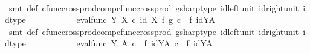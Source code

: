 \begin{isabellebody}
\ \ \ \ \ \ \ \ \isamarkupfalse%
\ {\isacharparenleft}{\kern0pt}smt\ {\isasympsi}{\isacharunderscore}{\kern0pt}def\ cfunc{\isacharunderscore}{\kern0pt}cross{\isacharunderscore}{\kern0pt}prod{\isacharunderscore}{\kern0pt}comp{\isacharunderscore}{\kern0pt}cfunc{\isacharunderscore}{\kern0pt}cross{\isacharunderscore}{\kern0pt}prod\ gsharp{\isacharunderscore}{\kern0pt}type\ id{\isacharunderscore}{\kern0pt}left{\isacharunderscore}{\kern0pt}unit{}\ id{\isacharunderscore}{\kern0pt}right{\isacharunderscore}{\kern0pt}unit{}\ id{\isacharunderscore}{\kern0pt}type{\isacharparenright}{\kern0pt}\isanewline
\ \ \ \ \ \ \isamarkupfalse%
\ \isamarkupfalse%
\ {\isachardoublequoteopen}{\isachardot}{\kern0pt}{\isachardot}{\kern0pt}{\isachardot}{\kern0pt}\ {\isacharequal}{\kern0pt}\ eval{\isacharunderscore}{\kern0pt}func\ Y\ X\ {\isasymcirc}\isactrlsub c\ {\isacharparenleft}{\kern0pt}id\ X\ {\isasymtimes}\isactrlsub f\ g\isactrlsup {\isasymsharp}{\isacharparenright}{\kern0pt}\ {\isasymcirc}\isactrlsub c\ {\isacharparenleft}{\kern0pt}{\isasympsi}\ {\isasymtimes}\isactrlsub f\ id{\isacharparenleft}{\kern0pt}Y\isactrlbsup A\isactrlesup {\isacharparenright}{\kern0pt}{\isacharparenright}{\kern0pt}{\isachardoublequoteclose}\isanewline
\ \ \ \ \ \ \ \ \isamarkupfalse%
\ {\isacharparenleft}{\kern0pt}smt\ {\isasympsi}{\isacharunderscore}{\kern0pt}def\ cfunc{\isacharunderscore}{\kern0pt}cross{\isacharunderscore}{\kern0pt}prod{\isacharunderscore}{\kern0pt}comp{\isacharunderscore}{\kern0pt}cfunc{\isacharunderscore}{\kern0pt}cross{\isacharunderscore}{\kern0pt}prod\ gsharp{\isacharunderscore}{\kern0pt}type\ id{\isacharunderscore}{\kern0pt}left{\isacharunderscore}{\kern0pt}unit{}\ id{\isacharunderscore}{\kern0pt}right{\isacharunderscore}{\kern0pt}unit{}\ id{\isacharunderscore}{\kern0pt}type{\isacharparenright}{\kern0pt}\isanewline
\ \ \ \ \ \ \isamarkupfalse%
\ \isamarkupfalse%
\ {\isachardoublequoteopen}{\isachardot}{\kern0pt}{\isachardot}{\kern0pt}{\isachardot}{\kern0pt}\ {\isacharequal}{\kern0pt}\ eval{\isacharunderscore}{\kern0pt}func\ Y\ A\ {\isasymcirc}\isactrlsub c\ {\isacharparenleft}{\kern0pt}{\isasymphi}\ {\isasymtimes}\isactrlsub f\ id{\isacharparenleft}{\kern0pt}Y\isactrlbsup A\isactrlesup {\isacharparenright}{\kern0pt}{\isacharparenright}{\kern0pt}\ {\isasymcirc}\isactrlsub c\ {\isacharparenleft}{\kern0pt}{\isasympsi}\ {\isasymtimes}\isactrlsub f\ id{\isacharparenleft}{\kern0pt}Y\isactrlbsup A\isactrlesup {\isacharparenright}{\kern0pt}{\isacharparenright}{\kern0pt}{\isachardoublequoteclose}\isanewline

\end{isabellebody}

